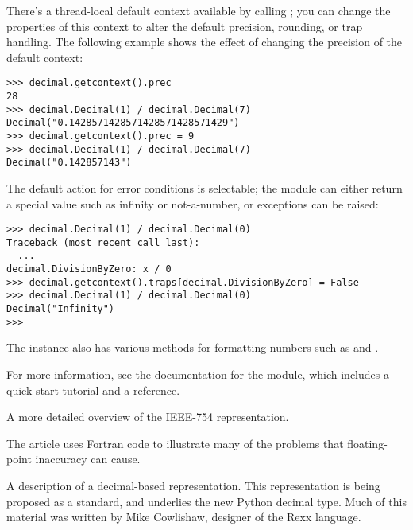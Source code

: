 \documentclass{howto}
\begin{document}
There's a thread-local default context available by calling
; you can change the properties of this context
to alter the default precision, rounding, or trap handling.  The
following example shows the effect of changing the precision of the default
context:

\begin{verbatim}
>>> decimal.getcontext().prec
28
>>> decimal.Decimal(1) / decimal.Decimal(7)
Decimal("0.1428571428571428571428571429")
>>> decimal.getcontext().prec = 9 
>>> decimal.Decimal(1) / decimal.Decimal(7)
Decimal("0.142857143")
\end{verbatim}

The default action for error conditions is selectable; the module can
either return a special value such as infinity or not-a-number, or
exceptions can be raised:

\begin{verbatim}
>>> decimal.Decimal(1) / decimal.Decimal(0)
Traceback (most recent call last):
  ...
decimal.DivisionByZero: x / 0
>>> decimal.getcontext().traps[decimal.DivisionByZero] = False
>>> decimal.Decimal(1) / decimal.Decimal(0)
Decimal("Infinity")
>>> 
\end{verbatim}

The  instance also has various methods for formatting 
numbers such as  and .

For more information, see the documentation for the 
module, which includes a quick-start tutorial and a reference.

\begin{seealso}

{A more detailed overview of the IEEE-754 representation.}

{The article uses Fortran code to illustrate many of the problems
that floating-point inaccuracy can cause.}

{A description of a decimal-based representation.  This representation
is being proposed as a standard, and underlies the new Python decimal
type.  Much of this material was written by Mike Cowlishaw, designer of the
Rexx language.}

\end{seealso}      
\end{document}
